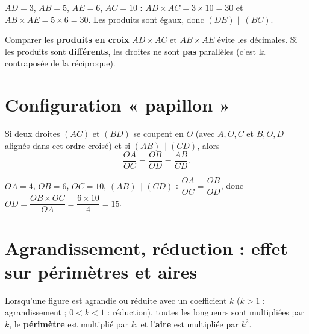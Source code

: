 \begin{exemple}
$AD=3$, $AB=5$, $AE=6$, $AC=10$ : $AD\times AC=3\times10=30$ et $AB\times AE=5\times6=30$.
Les produits sont égaux, donc $(DE)\parallel(BC)$.
\end{exemple}

\begin{remarque}
Comparer les \textbf{produits en croix} $AD\times AC$ et $AB\times AE$ évite les décimales.
Si les produits sont \textbf{différents}, les droites ne sont \textbf{pas} parallèles (c'est
la contraposée de la réciproque).
\end{remarque}

\section{Configuration « papillon »}

\begin{propriete}
Si deux droites $(AC)$ et $(BD)$ se coupent en $O$ (avec $A,O,C$ et $B,O,D$ alignés dans cet
ordre croisé) et si $(AB)\parallel(CD)$, alors
\[
\frac{OA}{OC}=\frac{OB}{OD}=\frac{AB}{CD}.
\]
\end{propriete}

\begin{exemple}
$OA=4$, $OB=6$, $OC=10$, $(AB)\parallel(CD)$ : $\dfrac{OA}{OC}=\dfrac{OB}{OD}$, donc
$OD=\dfrac{OB\times OC}{OA}=\dfrac{6\times10}4=15$.
\end{exemple}

\section{Agrandissement, réduction : effet sur périmètres et aires}

\begin{propriete}
Lorsqu'une figure est agrandie ou réduite avec un coefficient $k$ ($k>1$ : agrandissement ;
$0<k<1$ : réduction), toutes les longueurs sont multipliées par $k$, le \textbf{périmètre}
est multiplié par $k$, et l'\textbf{aire} est multipliée par $k^{2}$.
\end{propriete}

\begin{illus}
\end{illus}

